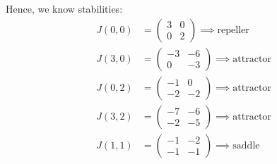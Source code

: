 \documentclass[12pt]{article}
\begin{document}
Hence, we know stabilities:
\color{red}
\begin{align*}
    J(0, 0) & = \begin{pmatrix}
                    3 & 0 \\
                    0 & 2
                \end{pmatrix} \implies \text{repeller}   \\
    J(3, 0) & = \begin{pmatrix}
                    -3 & -6 \\
                    0  & -3
                \end{pmatrix} \implies \text{attractor}  \\
    J(0, 2) & = \begin{pmatrix}
                    -1 & 0  \\
                    -2 & -2
                \end{pmatrix} \implies \text{attractor}  \\
    J(3, 2) & = \begin{pmatrix}
                    -7 & -6 \\
                    -2 & -5
                \end{pmatrix}  \implies \text{attractor} \\
    J(1, 1) & = \begin{pmatrix}
                    -1 & -2 \\
                    -1 & -1
                \end{pmatrix} \implies \text{saddle}
\end{align*}
\end{document}
